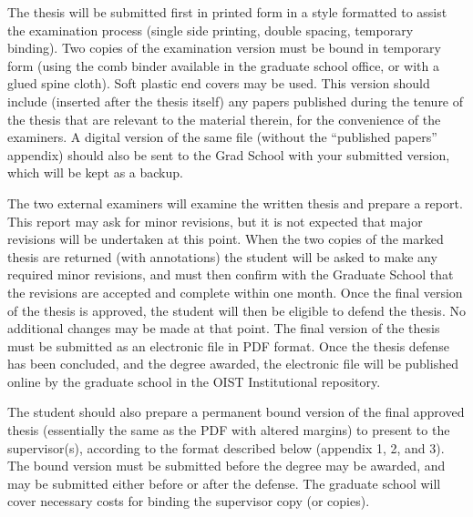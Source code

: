 The thesis will be submitted first in printed form in a style formatted to assist the examination process (single side printing, double spacing, temporary binding).  Two copies of the examination version must be bound in temporary form (using the comb binder available in the graduate school office, or with a glued spine cloth).  Soft plastic end covers may be used. This version should include (inserted after the thesis itself)  any papers published during the tenure of the thesis that are relevant to the material therein, for the convenience of the examiners.  A digital version of the same file (without the ``published papers'' appendix) should also be sent to the Grad School with your submitted version, which will be kept as a backup.

The two external examiners will examine the written thesis and prepare a report.  This report may ask for minor revisions, but it is not expected that major revisions will be undertaken at this point. When the two copies of the marked thesis are returned (with annotations) the student will be asked to make any required minor revisions, and must then confirm with the Graduate School that the revisions are accepted and complete within one month.  Once the final version of the thesis is approved, the student will then be eligible to defend the thesis.  No additional changes may be made at that point.  The final version of the thesis must be submitted as an electronic file in PDF format.  Once the thesis defense has been concluded, and the degree awarded, the electronic file will be published online by the graduate school in the OIST Institutional repository.

The student should also prepare a permanent bound version of the final approved thesis (essentially the same as the PDF with altered margins) to present to the supervisor(s), according to the format described below (appendix 1, 2, and 3).  The bound version must be submitted before the degree may be awarded, and may be submitted either before or after the defense.  The graduate school will cover necessary costs for binding the supervisor copy (or copies).
